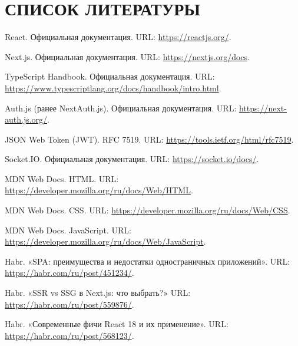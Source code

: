 \section*{СПИСОК ЛИТЕРАТУРЫ}
\vspace{-1.5\baselineskip}

\begingroup
  \let\clearpage\relax
  \let\newpage\relax
  
  \renewcommand{\refname}{}

  \begin{thebibliography}{99}

    React. Официальная документация. URL: \url{https://reactjs.org/}.

    Next.js. Официальная документация. URL: \url{https://nextjs.org/docs}.

    TypeScript Handbook. Официальная документация. URL: \url{https://www.typescriptlang.org/docs/handbook/intro.html}.

    Auth.js (ранее NextAuth.js). Официальная документация. URL: \url{https://next-auth.js.org/}.

    JSON Web Token (JWT). RFC 7519. URL: \url{https://tools.ietf.org/html/rfc7519}.

    Socket.IO. Официальная документация. URL: \url{https://socket.io/docs/}.

    MDN Web Docs. HTML. URL: \url{https://developer.mozilla.org/ru/docs/Web/HTML}.

    MDN Web Docs. CSS. URL: \url{https://developer.mozilla.org/ru/docs/Web/CSS}.

    MDN Web Docs. JavaScript. URL: \url{https://developer.mozilla.org/ru/docs/Web/JavaScript}.

    Habr. «SPA: преимущества и недостатки одностраничных приложений». URL: \url{https://habr.com/ru/post/451234/}.

    Habr. «SSR vs SSG в Next.js: что выбрать?» URL: \url{https://habr.com/ru/post/559876/}.

    Habr. «Современные фичи React 18 и их применение». URL: \url{https://habr.com/ru/post/568123/}.


\end{thebibliography}
